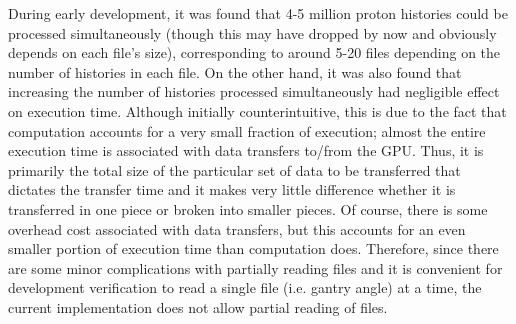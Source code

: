 \documentclass{article}
\begin{document}
During early development, it was found that 4-5 million proton histories could be processed simultaneously (though this may have dropped by now and obviously depends on each file's size), corresponding to around 5-20 files depending on the number of histories in each file.  On the other hand, it was also found that increasing the number of histories processed simultaneously had negligible effect on execution time.  Although initially counterintuitive, this is due to the fact that computation accounts for a very small fraction of execution; almost the entire execution time is associated with data transfers to/from the GPU.  Thus, it is primarily the total size of the particular set of data to be transferred that dictates the transfer time and it makes very little difference whether it is transferred in one piece or broken into smaller pieces.  Of course, there is some overhead cost associated with data transfers, but this accounts for an even smaller portion of execution time than computation does.  Therefore, since there are some minor complications with partially reading files and it is convenient for development verification to read a single file (i.e. gantry angle) at a time, the current implementation does not allow partial reading of files.
\end{document}
